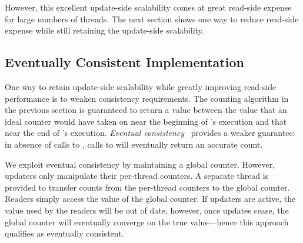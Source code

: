 \QuickQuizLabel{\StatisticalCounterAccuracy}

However, this excellent update-side scalability comes at great read-side
expense for large numbers of threads.
The next section shows one way to reduce read-side expense while
still retaining the update-side scalability.

\subsection{Eventually Consistent Implementation}
\label{sec:count:Eventually Consistent Implementation}

One way to retain update-side scalability while greatly improving
read-side performance is to weaken consistency requirements.
The counting algorithm in the previous section is guaranteed to
return a value between the value that an ideal counter would have
taken on near the beginning of 's execution and
that near the end of 's execution.
\emph{Eventual consistency}~\cite{WernerVogels:2009:EventuallyConsistent}
provides a weaker
guarantee: in absence of calls to , calls to
 will eventually return an accurate count.

We exploit eventual consistency by maintaining a global counter.
However, updaters only manipulate their per-thread counters.
A separate thread is provided to transfer counts from the per-thread
counters to the global counter.
Readers simply access the value of the global counter.
If updaters are active, the value used by the readers will be out of
date, however, once updates cease, the global counter will eventually
converge on the true value---hence this approach qualifies as
eventually consistent.

\begin{listing}[tbp]

\caption{Array-Based Per-Thread Eventually Consistent Counters}
\label{lst:count:Array-Based Per-Thread Eventually Consistent Counters}
\end{listing}

